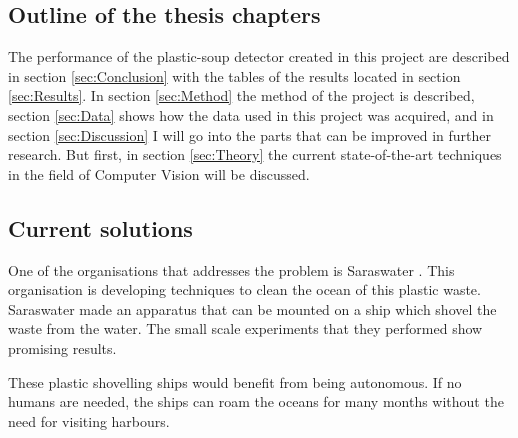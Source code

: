 \subsection{Outline of the thesis chapters}
\label{sec:Intro-Outline}
The performance of the plastic-soup detector created in this project are described in section \ref{sec:Conclusion} with the tables of the results located in section \ref{sec:Results}.
In section \ref{sec:Method} the method of the project is described, section \ref{sec:Data} shows how the data used in this project was acquired, and in section \ref{sec:Discussion} I will go into the parts that can be improved in further research.
But first, in section \ref{sec:Theory} the current state-of-the-art techniques in the field of Computer Vision will be discussed.















\iffalse



\subsection{Current solutions}
\label{sec:Intro-Current}


One of the organisations that addresses the problem is Saraswater \citeneed.
This organisation is developing techniques to clean the ocean of this plastic waste.
Saraswater made an apparatus that can be mounted on a ship which shovel the waste from the water.
The small scale experiments that they performed show promising results.

These plastic shovelling ships would benefit from being autonomous.
If no humans are needed, the ships can roam the oceans for many months without the need for visiting harbours.

